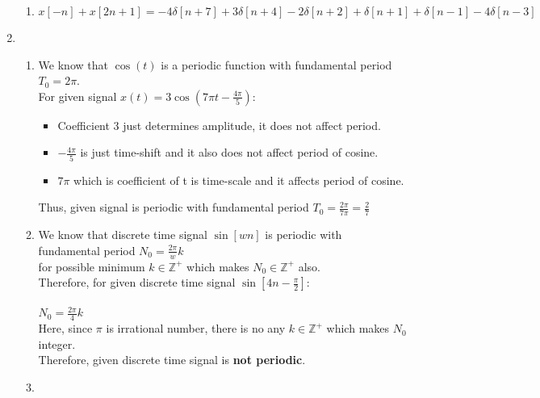 \documentclass[10pt,a4paper, margin=1in]{article}
\begin{document}
\begin{enumerate}
\begin{enumerate}
    \item %
    
    $x[-n] + x[2n+1] = -4\delta[n+7] + 3\delta[n+4] -2\delta[n+2] + \delta[n+1] + \delta[n-1] -4\delta[n-3]$
    \end{enumerate}

\item %
    \begin{enumerate}
    \item %
    
    We know that $\cos(t)$ is a periodic function with fundamental period $T_0 = 2\pi$.\\
     For given signal $x(t) = 3 \cos(7\pi t - \frac{4\pi}{5})$: \\
     \begin{itemize}
  	\item Coefficient 3 just determines amplitude, it does not affect period.
  	\item $-\frac{4 \pi}{5}$ is just time-shift and it also does not affect period of cosine.
  	\item $7 \pi$ which is coefficient of t is time-scale and it affects period of cosine. 
	\end{itemize}
	
	Thus, given signal is periodic with fundamental period $T_0 = \frac{2 \pi}{7 \pi} = \frac{2}{7}$ 
    \item %
    
    We know that discrete time signal $\sin[wn]$ is periodic with fundamental period $N_0 = \frac{2 \pi}{w}k$  \\ for possible minimum $ k \in \mathbb{Z}^+$ which makes $N_0 \in \mathbb{Z}^+$ also. \\
    Therefore, for given discrete time signal $\sin[4n - \frac{\pi}{2}]$: \\
    \\
    $N_0 = \frac{2 \pi}{4} k$ \\
    Here, since $\pi$ is irrational number, there is no any $k \in \mathbb{Z}^+$ which makes $N_0$ integer. \\
    Therefore, given discrete time signal is \textbf{not periodic}.
    \item %
    

\end{enumerate}
\end{enumerate}
\end{document}
